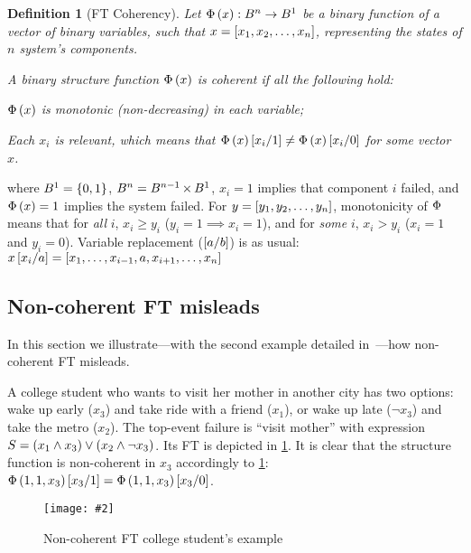 \documentclass[12pt,openright,twoside,a4paper,oldfontcommands,english,brazil,final]{abntex2}
\newtheorem{definition}{Definition}[chapter]
\theoremstyle{theo}
\newcommand{\includegraphicsaspectratio}[2][1]{%
  \texttt{[image: \#2]}%
}
\newcommand{\setsin}[1]{\ensuremath\left\{ #1 \right\}}
\newcommand{\parsin}[1]{\ensuremath\left( #1 \right)}
\newcommand{\squaresin}[1]{\ensuremath\left[ #1 \right]}
\def\cartesian{\ensuremath\operatorname{\times}}
\def\ftcoherencyop{\ensuremath\operatorname{\Phi}}
\newcommand{\ftcoherency}[1]{\ensuremath\ftcoherencyop\parsin{#1}}
\newcommand{\replace}[2]{\ensuremath\squaresin{#1\middle/#2}}
\begin{document}
\begin{definition}[\ac{FT} Coherency]
\label{def:ft-coherency}
Let $\ftcoherency{x}:B^n \rightarrow B^1$ be a binary function of a vector of binary variables, such that $x = \squaresin{x_1, x_2,\ldots,x_n}$, representing the states of $n$ system's components.

A binary structure function $\ftcoherency{x}$ is coherent if all the following hold:
\begin{alineas}
  \item $\ftcoherency{x}$ is monotonic (non-decreasing) in each variable;
  \item Each $x_i$ is relevant, which means that $\ftcoherency{x}\replace{x_i}{1} \neq \ftcoherency{x}\replace{x_i}{0}$ for some vector $x$.
\end{alineas}%
\end{definition}%
%
\noindent where $B^1 = \setsin{0,1}$, $B^n = B^{n-1} \cartesian B^1$, $x_i = 1$ implies that component $i$ failed, and $\ftcoherency{x} = 1$ implies the system failed.
For $y = \squaresin{y_1,y_2,\ldots,y_n}$, monotonicity of $\ftcoherencyop$ means that for \emph{all} $i$, $x_i \ge y_i$ ($y_i = 1 \implies x_i = 1$), and for \emph{some} $i$, $x_i > y_i$ ($x_i = 1$ and $y_i = 0$).
Variable replacement ($\replace{a}{b}$) is as usual:
$x\replace{x_i}{a} = \squaresin{x_1, \ldots, x_{i-1}, a, x_{i+1}, \ldots, x_n}$

\subsection{Non-coherent \acl*{FT} misleads}
\label{sec:non-coherent-misleads-example}

In this section we illustrate---with the second example detailed in~\cite{Oliv2006}---how non-coherent \ac{FT} misleads.

A college student who wants to visit her mother in another city has two options: wake up early ($x_3$) and take ride with a friend ($x_1$), or wake up late ($\lnot x_3$) and take the metro ($x_2$).
The top-event failure is ``visit mother'' with expression $S = \parsin{x_1 \land x_3} \lor \parsin{x_2 \land \lnot x_3}$.
Its \acl{FT} is depicted in \cref{fig:non-coherent-ft-example}.
It is clear that the structure function is non-coherent in $x_3$ accordingly to \cref{def:ft-coherency}: $\ftcoherency{1,1,x_3}\replace{x_3}{1}=\ftcoherency{1,1,x_3}\replace{x_3}{0}$.

\begin{figure}[htb]
  \centering
  \includegraphicsaspectratio[0.55]{non-coherent-ft-example}
  \caption{Non-coherent \ac{FT} college student's example}
  \label{fig:non-coherent-ft-example}
\end{figure}
\end{document}
